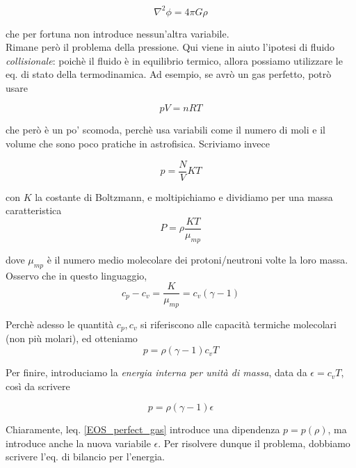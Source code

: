 \documentclass{report}
\begin{document}
\begin{equation}
    \nabla^2\phi = 4\pi G\rho 
\end{equation}

che per fortuna non introduce nessun'altra variabile. \\

Rimane però il problema della pressione. Qui viene in aiuto l'ipotesi di fluido \emph{collisionale}: poichè il fluido è in equilibrio termico, allora possiamo utilizzare le eq. di stato della termodinamica. Ad esempio, se avrò un gas perfetto, potrò usare 

\begin{equation}
    pV = nRT
\end{equation}

che però è un po' scomoda, perchè usa variabili come il numero di moli e il volume che sono poco pratiche in astrofisica. Scriviamo invece

\begin{equation}
    p = \frac{N}{V}KT
\end{equation}

con $K$ la costante di Boltzmann, e moltipichiamo e dividiamo per una massa caratteristica 
\begin{equation}
    P = \rho \frac{KT}{\mu_{mp}}
\end{equation}

dove $\mu_{mp}$ è il numero medio molecolare dei protoni/neutroni volte la loro massa. Osservo che in questo linguaggio, 
\begin{equation}
    c_p - c_v = \frac{K}{\mu_{mp}} = c_v(\gamma -1)
\end{equation}

Perchè adesso le quantità $c_p, c_v $ si riferiscono alle capacità termiche molecolari (non più molari), ed otteniamo
\begin{equation}
    p = \rho (\gamma -1)c_v T
\end{equation}

Per finire, introduciamo la \emph{energia interna per unità di massa}, data da $\epsilon = c_vT$, così da scrivere 

\begin{tcolorbox}[colback=myg!15, colframe=black, boxrule=1pt]
\begin{equation}
    \label{EOS_perfect_gas}
    p = \rho(\gamma -1)\epsilon
\end{equation}
\end{tcolorbox}

Chiaramente, leq. \ref{EOS_perfect_gas} introduce una dipendenza $p = p(\rho)$, ma introduce anche la nuova variabile $\epsilon$. Per risolvere dunque il problema, dobbiamo scrivere l'eq. di bilancio per l'energia. \\
\end{document}
